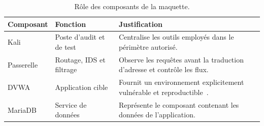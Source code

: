 \begin{table}[H]
    \centering
    \caption{Rôle des composants de la maquette.}\label{tab:composants}
    \begin{tabular}{@{}p{}p{}p{}@{}}
        \toprule
        Composant & Fonction & Justification \\
        \midrule
        Kali & Poste d'audit et de test & Centralise les outils employés dans le périmètre autorisé. \\
        Passerelle & Routage, IDS et filtrage & Observe les requêtes avant la traduction d'adresse et contrôle les flux. \\
        DVWA & Application cible & Fournit un environnement explicitement vulnérable et reproductible~\cite{dvwa}. \\
        MariaDB & Service de données & Représente le composant contenant les données de l'application. \\
        \bottomrule
    \end{tabular}
\end{table}
